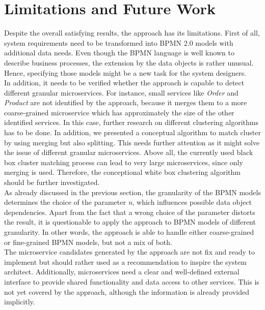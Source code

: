 \section{Limitations and Future Work}
Despite the overall satisfying results, the approach has its limitations. First of all, system requirements need to be transformed into BPMN 2.0 models with additional data needs. Even though the BPMN language is well known to describe business processes, the extension by the data objects is rather unusual. Hence, specifying those models might be a new task for the system designers.  \\
In addition, it needs to be verified whether the approach is capable to detect different granular microservices. For instance, small services like \textit{Order} and \textit{Product} are not identified by the approach, because it merges them to a more coarse-grained microservice which has approximately the size of the other identified services. In this case, further research on different clustering algorithms has to be done. In addition, we presented a conceptual algorithm to match cluster by using merging but also splitting. This needs further attention as it might solve the issue of different granular microservices.  Above all, the currently used black box cluster matching process can lead to very large microservices, since only merging is used. Therefore, the conceptional white box clustering algorithm should be further investigated. \\
As already discussed in the previous section, the granularity of the BPMN models determines the choice of the parameter \textit{n}, which influences possible data object dependencies. 
Apart from the fact that a wrong choice of the parameter distorts the result, it is questionable to apply the approach to BPMN models of different granularity. In other words, the approach is able to handle either coarse-grained or fine-grained BPMN models, but not a mix of both. \\
The microservice candidates generated by the approach are not fix and ready to implement but should rather used as a recommendation to inspire the system architect. Additionally, microservices need a clear and well-defined external interface to provide shared functionality and data access to other services. This is not yet covered by the approach, although the information is already provided implicitly. 



